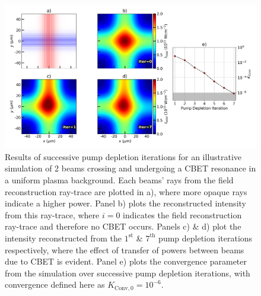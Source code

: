 \begin{figure}[t!]
    \includegraphics[width=1.0\linewidth]{Numerics/Images/PumpDepletionIterations.png}
    \centering
    \caption{Results of successive pump depletion iterations for an illustrative simulation of 2 beams crossing and undergoing a \ac{CBET} resonance in a uniform plasma background.
    Each beams' rays from the field reconstruction ray-trace are plotted in a), where more opaque rays indicate a higher power.
    Panel b) plots the reconstructed intensity from this ray-trace, where $i=0$ indicates the field reconstruction ray-trace and therefore no \ac{CBET} occurs.
    Panels c) \& d) plot the intensity reconstructed from the $1^{\text{st}}$ \& $7^{\text{th}}$ pump depletion iterations respectively, where the effect of transfer of powers between beams due to \ac{CBET} is evident.
    Panel e) plots the convergence parameter from the simulation over successive pump depletion iterations, with convergence defined here as $K_{\text{Conv},0}=10^{-6}$.}%
    \label{fig:PumpDepIters}
\end{figure}

